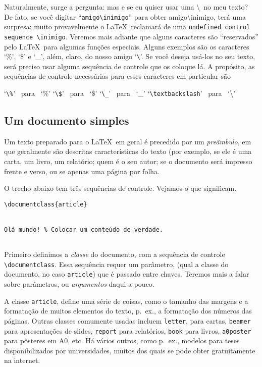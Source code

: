 Naturalmente, surge a pergunta: mas e se eu quiser usar uma
\textbackslash\ no meu texto? De fato, se você digitar
``\verb|amigo\inimigo|'' para obter amigo\textbackslash inimigo, terá
uma surpresa: muito provavelmente o \LaTeX\ reclamará de uma
\verb!undefined control sequence \inimigo!. Veremos mais adiante que
alguns caracteres são ``reservados'' pelo \LaTeX\ para algumas funções
especiais. Alguns exemplos são os caracteres `\%', `\$' e `\_', além,
claro, do nosso amigo `\verb|\|'. Se você deseja usá-los no seu texto,
será preciso usar alguma sequência de controle que os coloque lá. A
propósito, as sequências de controle necessárias para esses caracteres
em particular são

\begin{center}
  `\verb|\%|' \ para \ `\%'%
  \qquad`\verb|\$|' \ para  \ `\$'%
  \qquad`\verb|\_|\negthinspace' \ para \ `\_'%
  \qquad`\verb|\textbackslash|' \ para \ `\textbackslash'\qquad
\end{center}

\subsection{Um documento simples}

Um texto preparado para o \LaTeX\ em geral é precedido por um
\emph{preâmbulo}, em que geralmente são descritas características do
texto (por exemplo, se ele é uma carta, um livro, um relatório; quem é
o seu autor; se o documento será impresso frente e verso, ou se apenas
uma página por folha.

O trecho abaixo tem três sequências de controle. Vejamos o que
significam. 

\begin{footnotesize}
\begin{verbatim}
\documentclass{article}


Olá mundo! % Colocar um conteúdo de verdade.


\end{verbatim}
\end{footnotesize}

Primeiro definimos a \emph{classe} do documento, com a
sequência de controle \verb|\documentclass|. Essa sequência requer um
parâmetro, (qual a classe do documento, no caso \verb!article!) que é passado entre
chaves. Teremos mais a falar sobre parâmetros, ou \emph{argumentos}
daqui a pouco.

A classe \verb!article!, define uma série
de coisas, como o tamanho das margens e a formatação de muitos
elementos do texto, p.~ex., a formatação dos números das páginas. Outras
classes comumente usadas incluem \verb!letter!, para cartas,
\verb!beamer! para apresentações de slides, \verb!report! para
relatórios, \verb!book! para livros, \verb!a0poster! para pôsteres em
A0, etc. Há vários outros, como p.~ex., modelos para teses
disponibilizados por universidades, muitos dos quais se pode obter
gratuitamente na internet.

